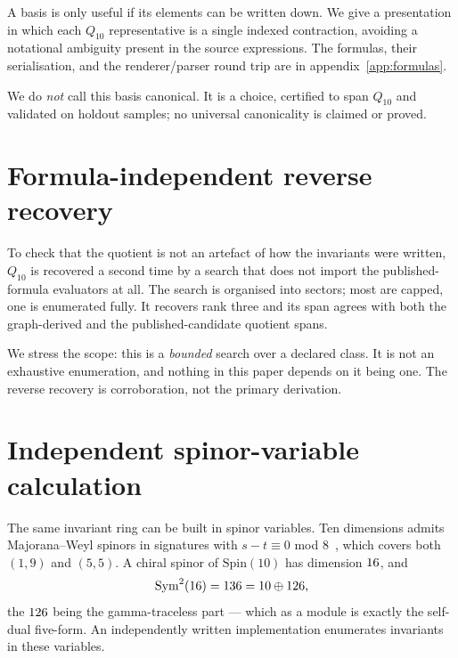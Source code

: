 \documentclass[11pt,a4paper]{article}
\begin{document}
A basis is only useful if its elements can be written down. We give a
presentation in which each $Q_{10}$ representative is a single indexed
contraction, avoiding a notational ambiguity present in the source expressions.
The formulas, their serialisation, and the renderer/parser round trip are in
appendix~\ref{app:formulas}.

We do \emph{not} call this basis canonical. It is a choice, certified to span
$Q_{10}$ and validated on holdout samples; no universal canonicality is claimed
or proved.

\section{Formula-independent reverse recovery}
\label{sec:reverse}

To check that the quotient is not an artefact of how the invariants were
written, $Q_{10}$ is recovered a second time by a search that does not import the
published-formula evaluators at all. The search is organised into sectors; most
are capped, one is enumerated fully. It recovers rank three and its span agrees
with both the graph-derived and the published-candidate quotient spans.

We stress the scope: this is a \emph{bounded} search over a declared class. It is
not an exhaustive enumeration, and nothing in this paper depends on it being one.
The reverse recovery is corroboration, not the primary derivation.

\section{Independent spinor-variable calculation}
\label{sec:spinor}

The same invariant ring can be built in spinor variables. Ten dimensions admits Majorana--Weyl spinors in signatures with $s-t \equiv 0$
mod $8$~\cite{Kugo:1982bn}, which covers both $(1,9)$ and $(5,5)$. A chiral
spinor of $\mathrm{Spin}(10)$ has dimension $16$, and
\begin{equation}
  \mathrm{Sym}^2(16) = 136 = 10 \oplus 126,
\end{equation}
the $126$ being the gamma-traceless part --- which as a module is
exactly the self-dual five-form. An independently written implementation
enumerates invariants in these variables.
\end{document}
